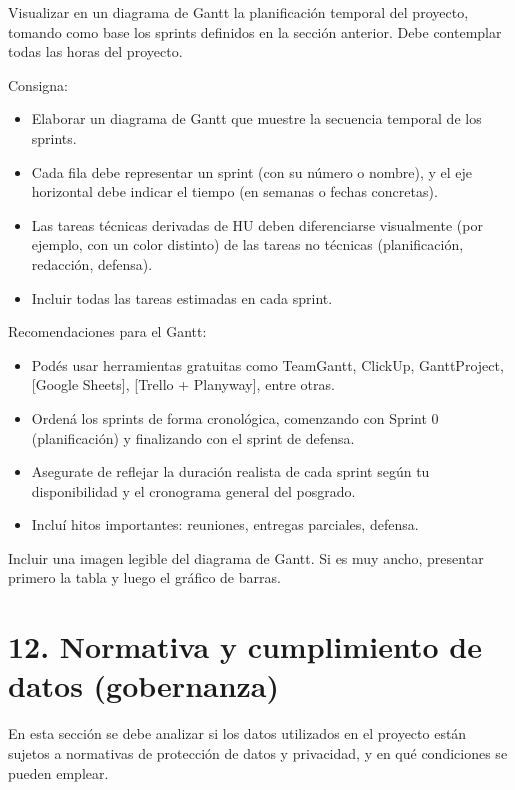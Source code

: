 \documentclass[
11pt, %
]{charter}
\begin{document}
Visualizar en un diagrama de Gantt la planificación temporal del proyecto, tomando como base los sprints definidos en la sección anterior. Debe contemplar todas las horas del proyecto.

Consigna:

\begin{itemize}

\item Elaborar un diagrama de Gantt que muestre la secuencia temporal de los sprints.

\item Cada fila debe representar un sprint (con su número o nombre), y el eje horizontal debe indicar el tiempo (en semanas o fechas concretas).

\item Las tareas técnicas derivadas de HU deben diferenciarse visualmente (por ejemplo, con un color distinto) de las tareas no técnicas (planificación, redacción, defensa).

\item Incluir todas las tareas estimadas en cada sprint.
\end{itemize}

Recomendaciones para el Gantt:

\begin{itemize}

	\item Podés usar herramientas gratuitas como TeamGantt, ClickUp, GanttProject, [Google Sheets], [Trello + Planyway], entre otras.
	\item Ordená los sprints de forma cronológica, comenzando con Sprint 0 (planificación) y finalizando con el sprint de defensa.
	\item Asegurate de reflejar la duración realista de cada sprint según tu disponibilidad y el cronograma general del posgrado.
	\item Incluí hitos importantes: reuniones, entregas parciales, defensa.
\end{itemize}


Incluir una imagen legible del diagrama de Gantt. Si es muy ancho, presentar primero la tabla y luego el gráfico de barras.



\section{12. Normativa y cumplimiento de datos (gobernanza)}

En esta sección se debe analizar si los datos utilizados en el proyecto están sujetos a normativas de protección de datos y privacidad, y en qué condiciones se pueden emplear.
\end{document}
